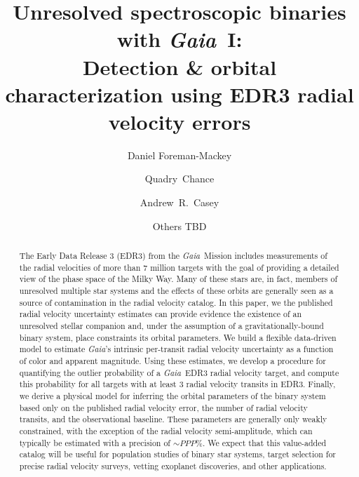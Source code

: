 \documentclass[modern, letterpaper]{aastex63}
\newcommand{\project}[1]{\textsl{#1}}
\newcommand{\Gaia}{\project{Gaia}}
\begin{document}
\title{Unresolved spectroscopic binaries with \Gaia\ I: \\
  Detection \& orbital characterization using EDR3 radial velocity errors}


\author[0000-0002-9328-5652]{Daniel Foreman-Mackey}

\author{Quadry~Chance}

\author{Andrew~R.~Casey}

\author{Others TBD}
\noaffiliation{}

\begin{abstract}
  The Early Data Release 3 (EDR3) from the \Gaia\ Mission includes measurements of the radial velocities of more than 7 million targets with the goal of providing a detailed view of the phase space of the Milky Way.
  Many of these stars are, in fact, members of unresolved multiple star systems and the effects of these orbits are generally seen as a source of contamination in the radial velocity catalog.
  In this paper, we the published radial velocity uncertainty estimates can provide evidence the existence of an unresolved stellar companion and, under the assumption of a gravitationally-bound binary system, place constraints its orbital parameters.
  We build a flexible data-driven model to estimate \Gaia's intrinsic per-transit radial velocity uncertainty as a function of color and apparent magnitude.
  Using these estimates, we develop a procedure for quantifying the outlier probability of a \Gaia\ EDR3 radial velocity target, and compute this probability for all targets with at least 3 radial velocity transits in EDR3.
  Finally, we derive a physical model for inferring the orbital parameters of the binary system based only on the published radial velocity error, the number of radial velocity transits, and the observational baseline.
  These parameters are generally only weakly constrained, with the exception of the radial velocity semi-amplitude, which can typically be estimated with a precision of $\sim PPP\%$.
  We expect that this value-added catalog will be useful for population studies of binary star systems, target selection for precise radial velocity surveys, vetting exoplanet discoveries, and other applications.
\end{abstract}
\end{document}
